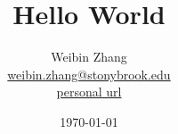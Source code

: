 \documentclass[tikz,10pt,oneside,a4paper]{report}
\title{Hello World}
\author{Weibin Zhang \\ \url{weibin.zhang@stonybrook.edu} \\ 
\url{personal url} }
\date{\today}
\begin{document}
\maketitle

\begin{multicols}{2}
    \tableofcontents\label{toc}    %
\end{multicols}









% 
% 
\end{document}

